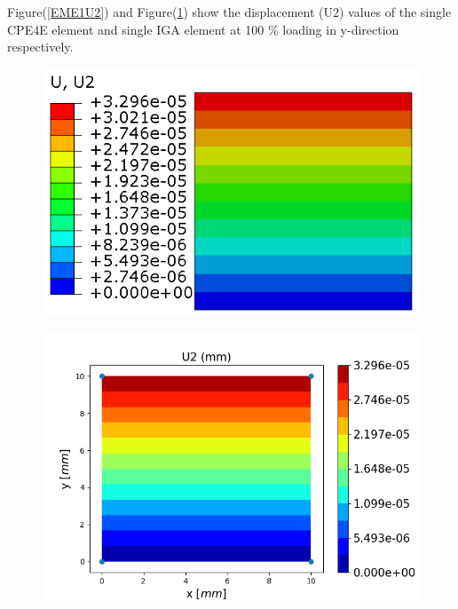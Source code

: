 \documentclass[11pt]{article}
\begin{document}
\noindent
Figure(\ref{EME1U2}) and Figure(\ref{EME1U2_IGA}) show the displacement (U2) values of the single CPE4E element and single IGA element at 100 \% loading in y-direction respectively. \\
\begin{figure}[H]
	\centering
	\begin{minipage}{.5\textwidth}
		\centering
		\includegraphics[width=1\linewidth]{EME1U2.png}
		\label{EME1U2}
	\end{minipage}%
	\begin{minipage}{.55\textwidth}
		\centering
		\includegraphics[width=1\linewidth]{EME1U2_IGA.png}
		\label{EME1U2_IGA}
	\end{minipage}
\end{figure}
\end{document}

